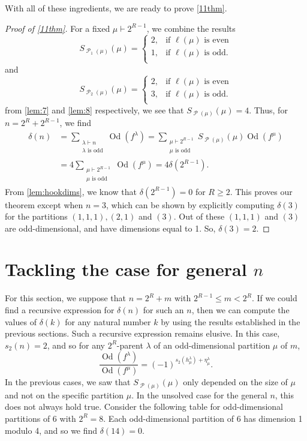 \documentclass[12pt]{amsart}
\theoremstyle{definition}
\numberwithin{equation}{section}
\newcommand{\la}{\lambda}
\DeclareMathOperator{\p}{\mathcal{P}}
\DeclareMathOperator{\Od}{Od}
\begin{document}
With all of these ingredients, we are ready to prove \cref{11thm}.
\begin{proof}[Proof of \cref{11thm}]
For a fixed $\mu\vdash 2^{R-1}$, we combine the results \[
S_{\p_1(\mu)}(\mu) = \begin{cases}
2 ,& \text{if } \ell(\mu)\text{ is even}\\
1, & \text{if }\ell(\mu) \text{ is odd}.\\
\end{cases}
\]
and \[
S_{\p_2(\mu)}({\mu}) = \begin{cases}
2 ,& \text{if }\ell(\mu)\text{ is even}\\
3, & \text{if }\ell(\mu) \text{ is odd}.\\
\end{cases}
\]
from \cref{lem:7} and \cref{lem:8} respectively, we see that $S_{\p(\mu)}(\mu) = 4$. Thus, for $n = 2^R + 2^{R-1}$, we find
\begin{align*}
\delta(n) &= \sum\limits_{\substack{\\\lambda\vdash n\\\lambda \text{ is odd}}} \Od(f^\lambda) = \sum\limits_{\substack{\mu\vdash 2^{R-1}\\\mu \text{ is odd}}} S_{\p(\mu)}({\mu})\Od(f^{\mu})\\
&= 4 \sum\limits_{\substack{\mu\vdash 2^{R-1}\\\mu \text{ is odd}}} \Od(f^{\mu})
= 4\delta(2^{R-1}).
\end{align*}
From \cref{lem:hookdims}, we know that $\delta(2^{R-1}) = 0$ for $R\geq 2$. This proves our theorem except when $n= 3$, which can be shown by explicitly computing $\delta(3)$ for the partitions $(1,1,1), (2,1)$ and $(3)$. Out of these $(1,1,1)$ and $(3)$ are odd-dimensional, and have dimensions equal to 1. So, $\delta(3) = 2$.
\end{proof}

\section{Tackling the case for general $n$}\label{sec:general-n}
For this section, we suppose that $n = 2^R + m$ with $2^{R-1}\leq m < 2^R$. If we could find a recursive expression for $\delta(n)$ for such an $n$, then we can compute the values of $\delta(k)$ for any natural number $k$ by using the results established in the previous sections. Such a recursive expression remains elusive. In this case, $s_2(n) = 2$, and so for any $2^R$-parent $\la$ of an odd-dimensional partition $\mu$ of $m$,
\[
\frac{\Od(f^\la)}{\Od(f^\mu)} = (-1)^{s_2(h^\la_\mu) + \eta^\la_\mu}. 
\]
In the previous cases, we saw that $S_{\p(\mu)}(\mu)$ only depended on the size of $\mu$ and not on the specific partition $\mu$. In the unsolved case for the general $n$, this does not always hold true. 
Consider the following table for odd-dimensional partitions of 6 with $2^R = 8$. Each odd-dimensional partition of 6 has dimension 1 modulo 4, and so we find $\delta(14) = 0$.
\end{document}
